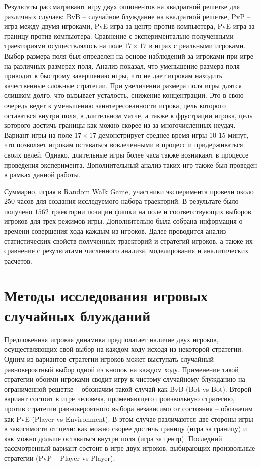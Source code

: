 Результаты рассматривают игру двух оппонентов на квадратной решетке для различных случаев:
BvB -- случайное блуждание на квадратной решетке, PvP -- игра между двумя игроками, PvE игра за центр против компьютера, PvE игра за границу против компьютера. 
Сравнение с экспериментально полученными траекториями осуществлялось на поле $17 \times 17$ в играх с 
реальными игроками. Выбор размера поля был определен на основе наблюдений за игроками при игре на различных размерах поля.
Анализ показал, что уменьшение размера поля приводит к быстрому завершению игры, что не дает игрокам находить качественные сложные
стратегии. При увеличении размера поля игры длятся слишком долго, что вызывает усталость, снижение концентрации.
Это в свою очередь ведет к уменьшению заинтересованности игрока, цель которого оставаться внутри поля, в длительном матче,
а также к фрустрации игрока, цель которого достичь границы как можно скорее из-за многочисленных неудач.
Вариант игры на поле $17 \times 17$ демонстрирует среднее время игры $10$-$15$ минут, что позволяет игрокам оставаться вовлеченными
в процесс и придерживаться своих целей. Однако, длительные игры более часа также возникают в процессе проведения эксперимента.
Дополнительный анализ таких игр также был проведен в рамках данной работы.

Суммарно, играя в Random Walk Game, участники эксперимента провели около $250$ часов для создания исследуемого набора траекторий.
В результате было получено $1562$ траектории позиции фишки на поле и соответствующих выборов игроков для трех режимов игры. 
Дополнительно была собрана информация о времени совершения хода каждым из игроков. 
Далее проводится анализ статистических свойств полученных траекторий и стратегий игроков, 
а также их сравнение с результатами численного анализа, моделирования и аналитических расчетов.


\section{Методы исследования игровых случайных блужданий}\label{sec:ch3/sec2}

Предложенная игровая динамика предполагает наличие двух игроков, осуществляющих свой выбор на каждом ходу исходя из некоторой стратегии.
Одним из вариантов стратегии игроков может выступать случайный равновероятный выбор одной из кнопок на каждом ходу.
Применение такой стратегии обоими игроками сводит игру к чистому случайному блужданию на ограниченной решетке -- обозначим такой случай как BvB (Bot vs Bot).
Второй вариант состоит в игре человека, применяющего произвольную стратегию, против стратегии равновероятного выбора независимо от состояния -- 
обозначим как PvE (Player vs Environment).
В этом случае различаются две стороны игры в зависимости от цели: как можно скорее достичь границу (игра за границу) и
как можно дольше оставаться внутри поля (игра за центр). Последний рассмотренный вариант состоит в игре двух игроков, 
выбирающих произвольные стратегии (PvP -- Player vs Player).

